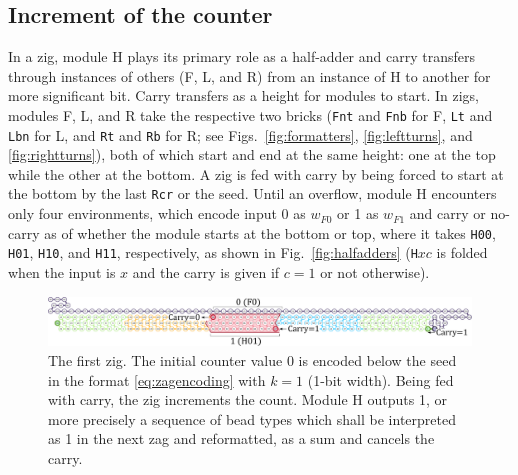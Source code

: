 \documentclass[twocolumn]{svjour3}
\begin{document}
\subsection{Increment of the counter}
In a zig, module H plays its primary role as a half-adder and carry transfers through instances of others (F, L, and R) from an instance of H to another for more significant bit.
Carry transfers as a height for modules to start.
In zigs, modules F, L, and R take the respective two bricks (\texttt{Fnt} and \texttt{Fnb} for F, \texttt{Lt} and \texttt{Lbn} for L, and \texttt{Rt} and \texttt{Rb} for R; see Figs.~\ref{fig:formatters}, \ref{fig:leftturns}, and \ref{fig:rightturns}), both of which start and end at the same height: one at the top while the other at the bottom.
A zig is fed with carry by being forced to start at the bottom by the last \texttt{Rcr} or the seed.
Until an overflow, module H encounters only four environments, which encode input 0 as $w_{F0}$ or 1 as $w_{F1}$ and carry or no-carry as of whether the module starts at the bottom or top, where it takes \texttt{H00}, \texttt{H01}, \texttt{H10}, and \texttt{H11}, respectively, as shown in Fig.~\ref{fig:halfadders} (\texttt{H}$xc$ is folded when the input is $x$ and the carry is given if $c=1$ or not otherwise).

\begin{figure}[tb]
\centering
\includegraphics[width=0.9\linewidth]{fig/svg/CounterEx5_1.pdf}
\caption{
The first zig.
The initial counter value 0 is encoded below the seed in the format \eqref{eq:zagencoding} with $k = 1$ (1-bit width).
Being fed with carry, the zig increments the count.
Module H outputs 1, or more precisely a sequence of bead types which shall be interpreted as 1 in the next zag and reformatted, as a sum and cancels the carry.
}

\label{fig:counter1stzig}
\end{figure}
\end{document}
